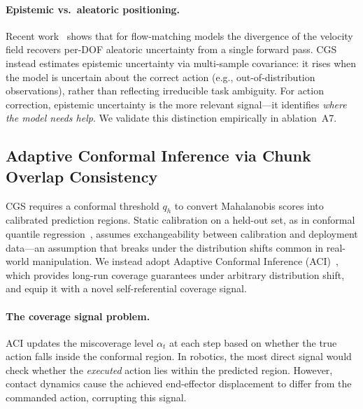 \paragraph{Epistemic vs.\ aleatoric positioning.}
Recent work~\cite{diu2026} shows that for flow-matching models the divergence of the velocity field recovers per-DOF aleatoric uncertainty from a single forward pass.  CGS instead estimates epistemic uncertainty via multi-sample covariance: it rises when the model is uncertain about the correct action (e.g., out-of-distribution observations), rather than reflecting irreducible task ambiguity.  For action correction, epistemic uncertainty is the more relevant signal---it identifies \emph{where the model needs help}.  We validate this distinction empirically in ablation~A7.


\subsection{Adaptive Conformal Inference via Chunk Overlap Consistency}
\label{sec:aci}

CGS requires a conformal threshold $q_h$ to convert Mahalanobis scores into calibrated prediction regions.  Static calibration on a held-out set, as in conformal quantile regression~\cite{romano2019cqr}, assumes exchangeability between calibration and deployment data---an assumption that breaks under the distribution shifts common in real-world manipulation.  We instead adopt Adaptive Conformal Inference (ACI)~\cite{gibbs2021aci}, which provides long-run coverage guarantees under arbitrary distribution shift, and equip it with a novel self-referential coverage signal.

\paragraph{The coverage signal problem.}
ACI updates the miscoverage level $\alpha_t$ at each step based on whether the true action falls inside the conformal region.  In robotics, the most direct signal would check whether the \emph{executed} action lies within the predicted region.  However, contact dynamics cause the achieved end-effector displacement to differ from the commanded action, corrupting this signal.

